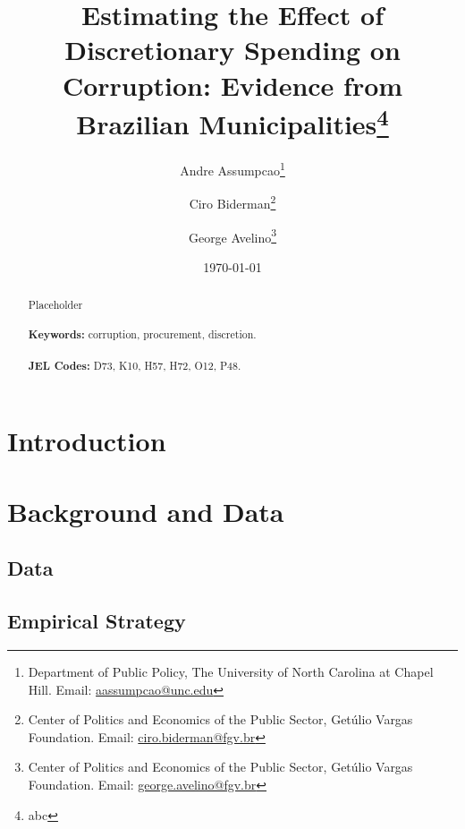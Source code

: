 \documentclass[11pt]{article}
\begin{document}
\begin{titlepage}
\title{Estimating the Effect of Discretionary Spending on Corruption: Evidence from Brazilian Municipalities\thanks{abc}}
\author{Andre Assumpcao\thanks{Department of Public Policy, The University of North Carolina at Chapel Hill. Email: \href{mailto:aassumpcao@unc.edu}{aassumpcao@unc.edu}} \and Ciro Biderman\thanks{Center of Politics and Economics of the Public Sector, Getúlio Vargas Foundation. Email: \href{mailto:ciro.biderman@fgv.br}{ciro.biderman@fgv.br}} \and George Avelino\thanks{Center of Politics and Economics of the Public Sector, Getúlio Vargas Foundation. Email: \href{mailto:george.avelino@fgv.br}{george.avelino@fgv.br}}}
\date{\today}
\maketitle
\begin{abstract}
\noindent Placeholder\\
\vspace{0in}\\
\noindent\textbf{Keywords:} corruption, procurement, discretion.\\
\vspace{0in}\\
\noindent\textbf{JEL Codes:} D73, K10, H57, H72, O12, P48.\\

\bigskip
\end{abstract}
\setcounter{page}{0}
\thispagestyle{empty}
\end{titlepage}
\pagebreak \newpage

\singlespacing

\section{Introduction} \label{sec:introduction}

\section{Background and Data} \label{sec:background}

\subsection{Data} \label{sec:data}

\subsection{Empirical Strategy} \label{sec:methodology}
\end{document}
